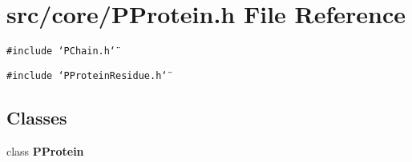 \section{src/core/PProtein.h File Reference}
\label{PProtein_8h}


{\tt \#include \char`\"{}PChain.h\char`\"{}}\par
{\tt \#include \char`\"{}PProtein\-Residue.h\char`\"{}}\par
\subsection*{Classes}
\begin{CompactItemize}
\item 
class {\bf PProtein}
\end{CompactItemize}

